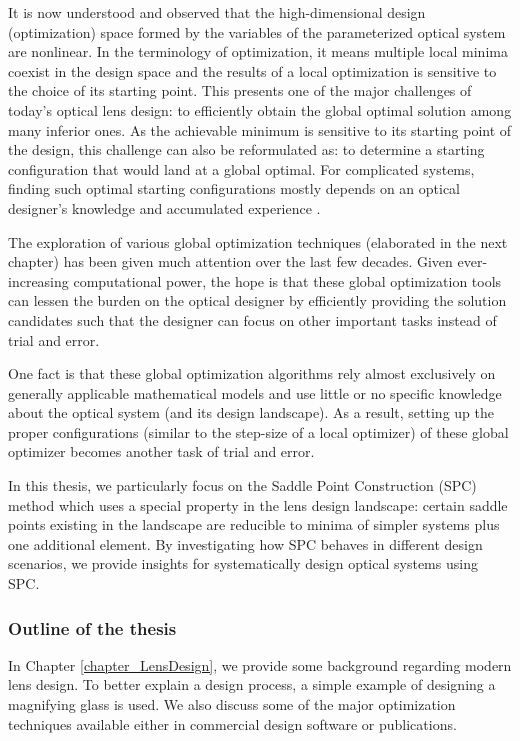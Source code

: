 It is now understood and observed that the high-dimensional design (optimization) space formed by the variables of the parameterized optical system are nonlinear. In the terminology of optimization, it means multiple local minima coexist in the design space and the results of a local optimization is sensitive to the choice of its starting point. This presents one of the major challenges of today's optical lens design: to efficiently obtain the global optimal solution among many inferior ones. As the achievable minimum is sensitive to its starting point of the design, this challenge can also be reformulated as: to determine a starting configuration that would land at a global optimal. For complicated systems, finding such optimal starting configurations mostly depends on an optical designer's knowledge and accumulated experience \cite{LivshitsQA2013}\cite{Shafer1995_moreless}. 

The exploration of various global optimization techniques (elaborated in the next chapter) has been given much attention over the last few decades. Given ever-increasing computational power, the hope is that these global optimization tools can lessen the burden on the optical designer by efficiently providing the solution candidates such that the designer can focus on other important tasks instead of trial and error. 

One fact is that these global optimization algorithms rely almost exclusively on generally applicable mathematical models and use little or no specific knowledge about the optical system (and its design landscape). As a result, setting up the proper configurations (similar to the step-size of a local optimizer) of these global optimizer becomes another task of trial and error. 

In this thesis, we particularly focus on the Saddle Point Construction (SPC) method which uses a special property in the lens design landscape: certain saddle points existing in the landscape are reducible to minima of simpler systems plus one additional element. By investigating how SPC behaves in different design scenarios, we provide insights for systematically design optical systems using SPC. 



\subsubsection{Outline of the thesis}
In Chapter \ref{chapter_LensDesign}, we provide some background regarding modern lens design. To better explain a design process, a simple example of designing a magnifying glass is used. We also discuss some of the major optimization techniques available either in commercial design software or publications. 

